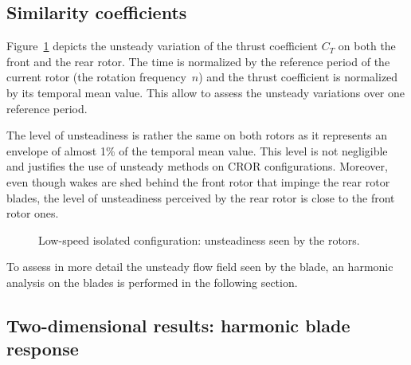 
\subsection{Similarity coefficients}
\label{sub:dream_ls_hb_sim_coeff}

Figure~\ref{fig:dream_ls_hb_unst_coeff} depicts the
unsteady variation of the thrust coefficient $C_T$ on 
both the front and the rear rotor.
The time is 
normalized by the reference period of the current rotor 
(the rotation frequency~$n$) and the thrust coefficient is normalized
by its temporal mean value. This allow to assess the unsteady variations
over one reference period. 


The level of unsteadiness is rather
the same on both rotors as it represents an envelope of almost
1\% of the temporal mean value. This level is not negligible and
justifies the use of unsteady methods on CROR configurations. 
Moreover, even though wakes are shed behind the front rotor
that impinge the rear rotor blades, the level of unsteadiness
perceived by the rear rotor is close to the front rotor ones.
\begin{figure}[htp]
  \centering
  \caption{Low-speed isolated configuration: unsteadiness seen by the rotors.}
  \label{fig:dream_ls_hb_unst_coeff}
\end{figure}

To assess in more detail the unsteady flow
field seen by the blade, an harmonic analysis on the
blades is performed in the following section.

\subsection{Two-dimensional results: harmonic blade response}
\label{sub:dream_ls_hb_blade_response}


